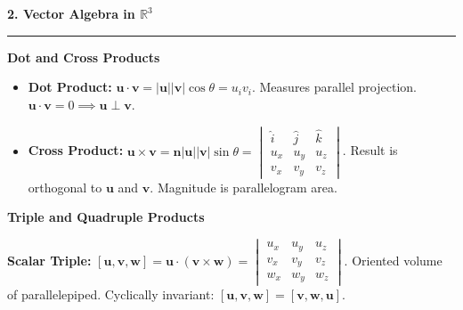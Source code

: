 \documentclass[10pt, landscape, twocolumn]{article}
\newcommand{\cheatsheetsection}[1]{
    \vspace{0.8em}
    {\color{themeblue}\large\bfseries #1} \par
    \vspace{-0.4em}
    {\color{themeblue}\rule{\linewidth}{1pt}} \par
    \vspace{0.3em}
}
\newcommand{\cheatsheetsubsection}[1]{
    \vspace{0.5em}
    {\color{themeblue}\normalsize\bfseries #1} \par
    \vspace{0.2em}
}
\begin{document}
\cheatsheetsection{2. Vector Algebra in $\mathbb{R}^3$}

\cheatsheetsubsection{Dot and Cross Products}
\begin{itemize}[leftmargin=*, nosep]
    \item \textbf{Dot Product:} $\mathbf{u} \cdot \mathbf{v} = |\mathbf{u}||\mathbf{v}|\cos\theta = u_i v_i$. Measures parallel projection. $\mathbf{u} \cdot \mathbf{v} = 0 \implies \mathbf{u} \perp \mathbf{v}$.
    \item \textbf{Cross Product:} $\mathbf{u} \times \mathbf{v} = \mathbf{n} |\mathbf{u}||\mathbf{v}|\sin\theta = \begin{vmatrix} \hat{i} & \hat{j} & \hat{k} \\ u_x & u_y & u_z \\ v_x & v_y & v_z \end{vmatrix}$. Result is orthogonal to $\mathbf{u}$ and $\mathbf{v}$. Magnitude is parallelogram area.
\end{itemize}

\begin{center}
\end{center}

\cheatsheetsubsection{Triple and Quadruple Products}
\textbf{Scalar Triple:} $[\mathbf{u}, \mathbf{v}, \mathbf{w}] = \mathbf{u} \cdot (\mathbf{v} \times \mathbf{w}) = \begin{vmatrix} u_x & u_y & u_z \\ v_x & v_y & v_z \\ w_x & w_y & w_z \end{vmatrix}$. Oriented volume of parallelepiped. Cyclically invariant: $[\mathbf{u}, \mathbf{v}, \mathbf{w}] = [\mathbf{v}, \mathbf{w}, \mathbf{u}]$.
\end{document}
